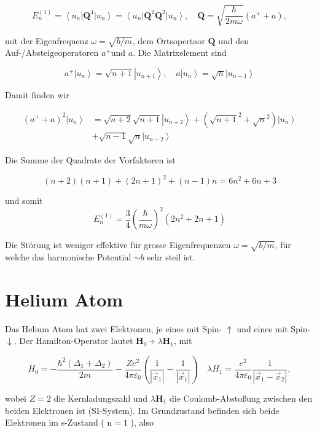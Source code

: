 \documentclass[10pt, letterpaper]{article}
\begin{document}
$$
E_{n}^{(1)}=\left\langle u_{n}\right| \mathbf{Q}^{4}\left|u_{n}\right\rangle=\left\langle u_{n}\right| \mathbf{Q}^{2} \mathbf{Q}^{2}\left|u_{n}\right\rangle, \quad \mathbf{Q}=\sqrt{\frac{\hbar}{2 m \omega}}\left(a^{+}+a\right),
$$

mit der Eigenfrequenz $\omega=\sqrt{b / m}$, dem Ortsopertaor $\mathbf{Q}$ und den Auf-/Absteigeoperatoren $a^{+}$und $a$. Die Matrixelement sind

$$
a^{+}\left|u_{n}\right\rangle=\sqrt{n+1}\left|u_{n+1}\right\rangle, \quad a\left|u_{n}\right\rangle=\sqrt{n}\left|u_{n-1}\right\rangle
$$

Damit finden wir

$$
\begin{aligned}
\left(a^{+}+a\right)^{2}\left|u_{n}\right\rangle & =\sqrt{n+2} \sqrt{n+1}\left|u_{n+2}\right\rangle+\left(\sqrt{n+1}^{2}+\sqrt{n}^{2}\right)\left|u_{n}\right\rangle \\
& +\sqrt{n-1} \sqrt{n}\left|u_{n-2}\right\rangle
\end{aligned}
$$

Die Summe der Quadrate der Vorfaktoren ist

$$
(n+2)(n+1)+(2 n+1)^{2}+(n-1) n=6 n^{2}+6 n+3
$$

und somit
$$
E_{n}^{(1)}=\frac{3}{4}\left(\frac{\hbar}{m \omega}\right)^{2}\left(2 n^{2}+2 n+1\right)
$$

Die Störung ist weniger effektive für grosse Eigenfrequenzen $\omega=\sqrt{b / m}$, für welche das harmonische Potential $\sim b$ sehr steil ist.

\section*{Helium Atom}
Das Helium Atom hat zwei Elektronen, je eines mit Spin- $\uparrow$ und eines mit Spin- $\downarrow$. Der Hamilton-Operator lautet $\mathbf{H}_{0}+\lambda \mathbf{H}_{1}$, mit

$$
H_{0}=-\frac{\hbar^{2}\left(\Delta_{1}+\Delta_{2}\right)}{2 m}-\frac{Z e^{2}}{4 \pi \varepsilon_{0}}\left(\frac{1}{\left|\vec{x}_{1}\right|}-\frac{1}{\left|\vec{x}_{1}\right|}\right) \quad \lambda H_{1}=\frac{e^{2}}{4 \pi \varepsilon_{0}} \frac{1}{\left|\vec{x}_{1}-\vec{x}_{2}\right|},
$$

wobei $Z=2$ die Kernladungszahl und $\lambda \mathbf{H}_{1}$ die Coulomb-Abstoßung zwischen den beiden Elektronen ist (SI-System). Im Grundzustand befinden sich beide Elektronen im s-Zustand ( $\mathrm{n}=1$ ), also
\end{document}
